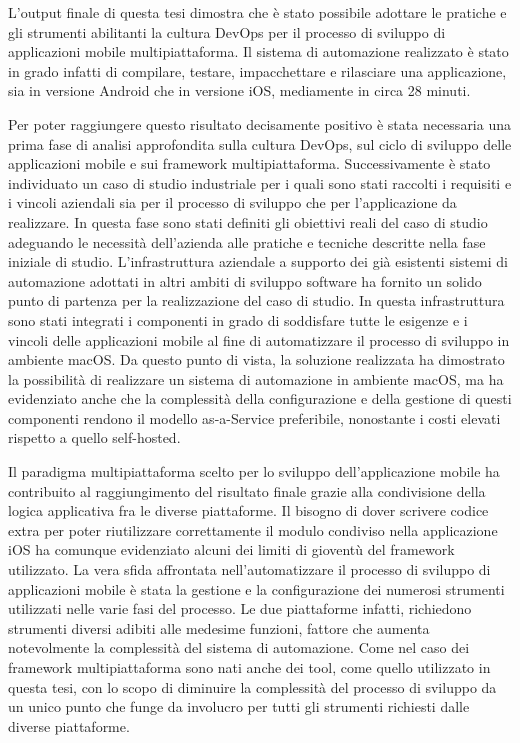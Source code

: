 
L'output finale di questa tesi dimostra che è stato possibile adottare le pratiche e gli strumenti abilitanti la cultura DevOps per il processo di sviluppo di applicazioni mobile multipiattaforma. Il sistema di automazione realizzato è stato in grado infatti di compilare, testare, impacchettare e rilasciare una applicazione, sia in versione Android che in versione iOS, mediamente in circa 28 minuti.

Per poter raggiungere questo risultato decisamente positivo è stata necessaria una prima fase di analisi approfondita sulla cultura DevOps, sul ciclo di sviluppo delle applicazioni mobile e sui framework multipiattaforma. Successivamente è stato individuato un caso di studio industriale per i quali sono stati raccolti i requisiti e i vincoli aziendali sia per il processo di sviluppo che per l'applicazione da realizzare. In questa fase sono stati definiti gli obiettivi reali del caso di studio adeguando le necessità dell'azienda alle pratiche e tecniche descritte nella fase iniziale di studio. L'infrastruttura aziendale a supporto dei già esistenti sistemi di automazione adottati in altri ambiti di sviluppo software ha fornito un solido punto di partenza per la realizzazione del caso di studio. In questa infrastruttura sono stati integrati i componenti in grado di soddisfare tutte le esigenze e i vincoli delle applicazioni mobile al fine di automatizzare il processo di sviluppo in ambiente macOS.
Da questo punto di vista,
la soluzione realizzata ha dimostrato la possibilità di realizzare un sistema di automazione in ambiente macOS,
ma ha evidenziato anche che la complessità della configurazione
e della gestione di questi componenti
rendono il modello as-a-Service preferibile,
nonostante i costi elevati rispetto a quello self-hosted.

Il paradigma multipiattaforma scelto per lo sviluppo dell'applicazione mobile
ha contribuito al raggiungimento del risultato finale
grazie alla condivisione della logica applicativa fra le diverse piattaforme.
%
Il bisogno di dover scrivere codice extra
per poter riutilizzare correttamente il modulo condiviso nella applicazione iOS
ha comunque evidenziato alcuni dei limiti di gioventù del framework utilizzato.
%
La vera sfida affrontata nell'automatizzare il processo di sviluppo di applicazioni mobile
è stata la gestione e la configurazione dei numerosi strumenti utilizzati nelle varie fasi del processo.
%
Le due piattaforme infatti,
richiedono strumenti diversi adibiti alle medesime funzioni,
fattore che aumenta notevolmente la complessità del sistema di automazione.
%
Come nel caso dei framework multipiattaforma sono nati anche dei tool,
come quello utilizzato in questa tesi,
con lo scopo di diminuire la complessità del processo di sviluppo da un unico punto che funge da involucro per tutti gli strumenti richiesti dalle diverse piattaforme.